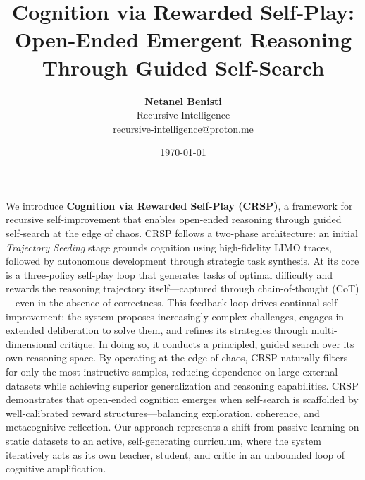 \documentclass[10pt,a4paper]{article}
\title{Cognition via Rewarded Self-Play: Open-Ended Emergent Reasoning Through Guided Self-Search}
\author{
    {\small\textbf{Netanel Benisti}}\\[0.1em]
    {\small\textmd{Recursive Intelligence}}\\[0.1em]
    {\small\color{gray}\textmd{recursive-intelligence@proton.me}}
}
\date{\today}
\renewcommand{\headrulewidth}{0.4pt}
\begin{document}
\fancypagestyle{firstpage}{%
    \fancyhf{}%
    \fancyhead[L]{\texttt{[image: logo.png]}}%
    \fancyhead[R]{\today}%
    \renewcommand{\headrulewidth}{0.4pt}%
}

\maketitle
\thispagestyle{firstpage}

\vspace{1cm}

\renewenvironment{abstract}
 {\par{}\par\vspace{1em}\noindent}
 {\par\vspace{1em}}

\begin{abstract}
We introduce \textbf{Cognition via Rewarded Self-Play (CRSP)}, a framework for recursive self-improvement that enables open-ended reasoning through guided self-search at the edge of chaos. CRSP follows a two-phase architecture: an initial \textit{Trajectory Seeding} stage grounds cognition using high-fidelity LIMO traces, followed by autonomous development through strategic task synthesis. At its core is a three-policy self-play loop that generates tasks of optimal difficulty and rewards the reasoning trajectory itself—captured through chain-of-thought (CoT)—even in the absence of correctness.
This feedback loop drives continual self-improvement: the system proposes increasingly complex challenges, engages in extended deliberation to solve them, and refines its strategies through multi-dimensional critique. In doing so, it conducts a principled, guided search over its own reasoning space. By operating at the edge of chaos, CRSP naturally filters for only the most instructive samples, reducing dependence on large external datasets while achieving superior generalization and reasoning capabilities.
CRSP demonstrates that open-ended cognition emerges when self-search is scaffolded by well-calibrated reward structures—balancing exploration, coherence, and metacognitive reflection. Our approach represents a shift from passive learning on static datasets to an active, self-generating curriculum, where the system iteratively acts as its own teacher, student, and critic in an unbounded loop of cognitive amplification.  
\end{abstract}
\end{document}
